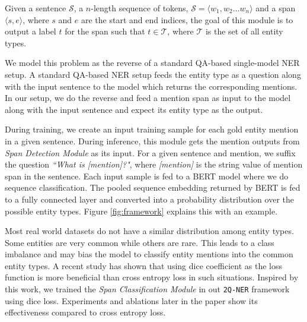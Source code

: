 Given a sentence $\mathcal{S}$, a $n$-length sequence of tokens, $\mathcal{S} = \langle w_1, w_2 \ldots w_n \rangle$ and a span $\langle s, e\rangle$, where $s$ and $e$ are the start and end indices, the goal of this module is to output a label $t$ for the span such that $t \in \mathcal{T}$, where $\mathcal{T}$ is the set of all entity types.

We model this problem as the reverse of a standard QA-based single-model NER setup. A standard QA-based NER setup feeds the entity type as a question along with the input sentence to the model which returns the corresponding mentions. In our setup, we do the reverse and feed a mention span as input to the model along with the input sentence and expect its entity type as the output. 

During training, we create an input training sample for each gold entity mention in a given sentence. During inference, this module gets the mention outputs from \textit{Span Detection Module} as its input. For a given sentence and mention, we suffix the question \textit{``What is [mention]?"}, where \textit{[mention]} is the string value of mention span in the sentence. Each input sample is fed to a BERT model where we do sequence classification. The pooled sequence embedding returned by BERT is fed to a fully connected layer and converted into a probability distribution over the possible entity types. Figure \ref{fig:framework} explains this with an example.


Most real world datasets do not have a similar distribution among entity types. Some entities are very common while others are rare. This leads to a class imbalance and may bias the model to classify entity mentions into the common entity types. A recent study \cite{li2019dice} has shown that using dice coefficient as the loss function is more beneficial than cross entropy loss in such situations. Inspired by this work, we trained the \textit{Span Classification Module} in out \texttt{2Q-NER} framework using dice loss. Experiments and ablations later in the paper show its effectiveness compared to cross entropy loss. 

